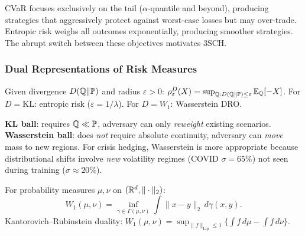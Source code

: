 \begin{remark}
CVaR focuses exclusively on the tail ($\alpha$-quantile and beyond), producing strategies that aggressively protect against worst-case losses but may over-trade. Entropic risk weighs all outcomes exponentially, producing smoother strategies. The abrupt switch between these objectives motivates 3SCH.
\end{remark}

\subsubsection{Dual Representations of Risk Measures}

\begin{definition}
Given divergence $D(\mathbb{Q}\|\mathbb{P})$ and radius $\varepsilon > 0$:
$\rho^D_\varepsilon(X) = \sup_{\mathbb{Q}: D(\mathbb{Q}\|\mathbb{P}) \le \varepsilon} \mathbb{E}_{\mathbb{Q}}[-X]$.
For $D = \mathrm{KL}$: entropic risk ($\varepsilon = 1/\lambda$). For $D = W_1$: Wasserstein DRO.
\end{definition}

\begin{remark}
\textbf{KL ball}: requires $\mathbb{Q} \ll \mathbb{P}$, adversary can only \emph{reweight} existing scenarios. \textbf{Wasserstein ball}: does \emph{not} require absolute continuity, adversary can \emph{move} mass to new regions. For crisis hedging, Wasserstein is more appropriate because distributional shifts involve \emph{new} volatility regimes (COVID $\sigma = 65\%$) not seen during training ($\sigma \approx 20\%$).
\end{remark}

\begin{definition}
For probability measures $\mu, \nu$ on $(\mathbb{R}^d, \|\cdot\|_2)$:
\begin{equation}
    W_1(\mu,\nu) = \inf_{\gamma \in \Gamma(\mu,\nu)} \int \|x-y\|_2\,d\gamma(x,y).
\end{equation}
Kantorovich--Rubinstein duality: $W_1(\mu,\nu) = \sup_{\|f\|_{\mathrm{Lip}} \le 1}\{\int f\,d\mu - \int f\,d\nu\}$.
\end{definition}

